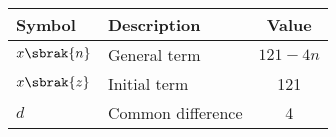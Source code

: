 \begin{tabular}{|l|l|c|}
\hline
\textbf{Symbol} & \textbf{Description} & \textbf{Value} \\
\hline
$x\sbrak{n}$ & General term & \(121 - 4n\) \\
\hline
$x\sbrak{z}$ & Initial term & 121 \\
\hline
$d$ & Common difference & 4 \\
\hline
\end{tabular}
